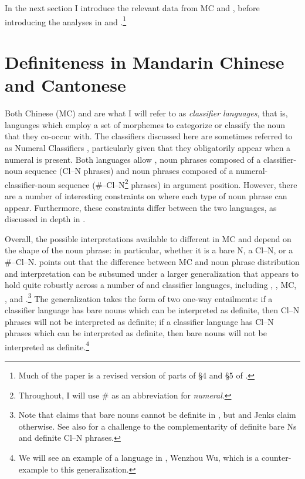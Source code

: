 \documentclass[output=paper
,modfonts
,nonflat]{langsci/langscibook}
\begin{document}
In the next section I introduce the relevant data from MC and , before introducing the analyses in \citet{ChengSybesma1999} and \citet{Simpson2005}.\footnote{Much of the paper is a revised version of parts of \S4 and \S5 of \citet{Hall2015}.}

\section{Definiteness in Mandarin Chinese and Cantonese} 

Both  Chinese (MC) and  are what I will refer to as \textit{classifier languages}, that is, languages which employ a set of morphemes to categorize or classify the noun that they co-occur with. The classifiers discussed here are sometimes referred to as Numeral Classifiers \citep{Aikhenvald2000}, particularly given that they obligatorily appear when a numeral is present. Both languages allow , noun phrases composed of a classifier-noun sequence (Cl--N phrases) and noun phrases composed of a numeral-classifier-noun sequence (\mbox{\#--Cl--N}\footnote{Throughout, I will use \# as an abbreviation for \textit{numeral}.} phrases) in argument position. However, there are a number of interesting constraints on where each type of noun phrase can appear. Furthermore, these constraints differ between the two languages, as discussed in depth in \citet{ChengSybesma1999}.


Overall, the possible interpretations available to different  in MC and  depend on the shape of the noun phrase: in particular, whether it is a bare N, a Cl--N, or a \#--Cl--N. \citet{Jenks2012} points out that the difference between MC and  noun phrase distribution and interpretation can be subsumed under a larger generalization that appears to hold quite robustly across a number of  and  classifier languages, including , , MC, , and .\footnote{Note that \citet{Trinh2011} claims that bare nouns cannot be definite in , but \citet{Nguyen2004} and Jenks claim otherwise. See also \citet{SimpsonEtAlii2011} for a challenge to the complementarity of definite bare Ns and definite Cl--N phrases.} The generalization takes the form of two one-way entailments: if a classifier language has bare nouns which can be interpreted as definite, then Cl--N phrases will not be interpreted as definite; if a classifier language has Cl--N phrases which can be interpreted as definite, then bare nouns will not be interpreted as definite.\footnote{We will see an example of a language in , Wenzhou Wu, which is a counter-example to this generalization.} 
\end{document}

